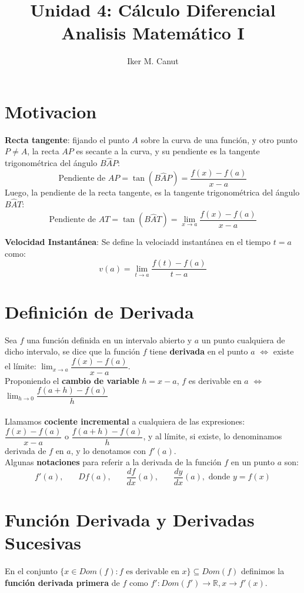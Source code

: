 \documentclass[11pt,a4paper]{article}
\author{Iker M. Canut}
\title{Unidad 4: C\'alculo Diferencial\\ Analisis Matem\'atico I}
\begin{document}
\maketitle
\newpage

\section{Motivacion}
\textbf{Recta tangente}: fijando el punto $A$ sobre la curva de una funci\'on, y otro punto $P\not=A$, la recta $AP$ es secante a la curva, y su pendiente es la tangente trigonom\'etrica del \'angulo $B\hat{A}P$:
$$\text{Pendiente de $AP$} = \tan(B\hat{A}P) = \dfrac{f(x)-f(a)}{x-a}$$
\indent Luego, la pendiente de la recta tangente, es la tangente trigonom\'etrica del \'angulo $B\hat{A}T$:
$$\text{Pendiente de $AT$} = \tan(B\hat{A}T) = \displaystyle{\lim_{x \to a} \dfrac{f(x)-f(a)}{x-a}}$$

\noindent \textbf{Velocidad Instant\'anea}: Se define la velociadd instant\'anea en el tiempo $t=a$ como:
$$v(a) = \displaystyle{\lim_{t \to a} \dfrac{f(t)-f(a)}{t-a}}$$

\section{Definici\'on de Derivada}
\indent \indent Sea $f$ una funci\'on definida en un intervalo abierto y $a$ un punto cualquiera de dicho intervalo, se dice que la funci\'on $f$ tiene \textbf{derivada} en el punto $a$ $\iff$ existe el l\'imite: $\displaystyle{\lim_{x \to a} \dfrac{f(x)-f(a)}{x-a}}$.\\
\indent Proponiendo el \textbf{cambio de variable} $h=x-a$, $f$ es derivable en $a$ $\iff$ $\displaystyle{\lim_{h \to 0} \dfrac{f(a+h)-f(a)}{h}}$\\ \\

Llamamos \textbf{cociente incremental} a cualquiera de las expresiones: $\dfrac{f(x)-f(a)}{x-a}$ o $\dfrac{f(a+h)-f(a)}{h}$, y al l\'imite, si existe, lo denominamos derivada de $f$ en $a$, y lo denotamos con $f'(a)$.\\

Algunas \textbf{notaciones} para referir a la derivada de la funci\'on $f$ en un punto $a$ son:
$$f'(a),\ \ \ \ \ \ \ \ Df(a),\ \ \ \ \ \ \ \ \dfrac{df}{dx}(a),\ \ \ \ \ \ \ \ \dfrac{dy}{dx}(a), \text{ donde $y=f(x)$}$$

\section{Funci\'on Derivada y Derivadas Sucesivas}
\indent \indent En el conjunto $\{x \in Dom(f) : f \text{ es derivable en $x$}\} \subseteq Dom(f)$ definimos la \textbf{funci\'on derivada primera} de $f$ como $f' : Dom(f') \rightarrow \mathbb{R}, x\rightarrow f'(x)$.\\
\end{document}
